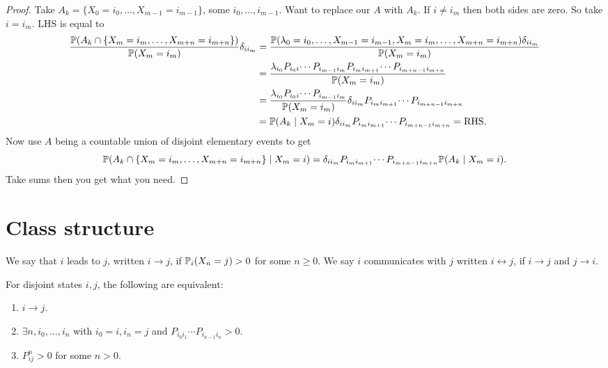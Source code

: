 \documentclass[10pt, a4paper]{article}
\begin{document}
\begin{theorem}
\begin{proof}
        Take $A_k = \{X_0 = i_0, \dotsc, X_{m - 1} = i_{m - 1}\}$,
        some $i_0, \dotsc, i_{m - 1}$.
        Want to replace our $A$ with $A_k$.
        If $i \neq i_m$ then both sides are zero.
        So take $i = i_m$.
        LHS is equal to
        \begin{align*}
            \frac{\P(A_k \cap \{X_m = i_m, \dotsc, X_{m + n} = i_{m + n}\})}{\P(X_m = i_m)}\delta_{ii_m} &= \frac{\P(\lambda_0 = i_0, \dotsc, X_{m - 1} = i_{m - 1}, X_m = i_m, \dotsc, X_{m + n} = i_{m + n})\delta_{ii_m}}{\P(X_m = i_m)} \\
            &= \frac{\lambda_{i_0}P_{i_0i}\dotsi P_{i_{m - 1}i_m}P_{i_mi_{m + 1}}\dotsi P_{i_{m + n - 1}i_{m + n}}}{\P(X_m = i_m)}  \\
            &= \frac{\lambda_{i_0}P_{i_0i} \dotsi P_{i_{m - 1}i_m}}{\P(X_m = i_m)} \delta_{ii_m}P_{i_mi_{m + 1}}\dotsi P_{i_{m + n - 1}i_{m + n}} \\
            &= \P(A_k \mid X_m = i)\delta_{ii_m}P_{i_mi_{m + 1}}\dotsi P_{i_{m + n - 1}i_{m + n}} = \text{RHS}.
        \end{align*}
        Now use $A$ being a countable union of disjoint elementary events to get
        \[
        \P(A_k \cap \{X_m = i_m, \dotsc, X_{m + n} = i_{m + n}\} \mid X_m = i) = \delta_{ii_m}P_{i_mi_{m + 1}}\dotsi P_{i_{m + n - 1}i_{m + n}}\P(A_k \mid X_m = i).
        \]
        Take sums then you get what you need.
    \end{proof}
\end{theorem}

\newpage

\section{Class structure}

We say that $i$ leads to $j$,
written $i \to j$,
if $\P_i(X_n = j) > 0$ for some $n \geq 0$.
We say $i$ communicates with $j$ written $i \leftrightarrow j$,
if $i \to j$ and $j \to i$.

\begin{theorem}
    For disjoint states $i, j$,
    the following are equivalent:

    \begin{enumerate}[label = (\roman*)]
        \item $i \to j$.

        \item $\exists n, i_0, \dotsc, i_n$ with $i_0 = i, i_n = j$ and $P_{i_0i_1}\dotsi P_{i_{n - 1}i_n} > 0$.

        \item $P_{ij}^{n} > 0$ for some $n > 0$.
    \end{enumerate}
\end{theorem}
\end{document}
